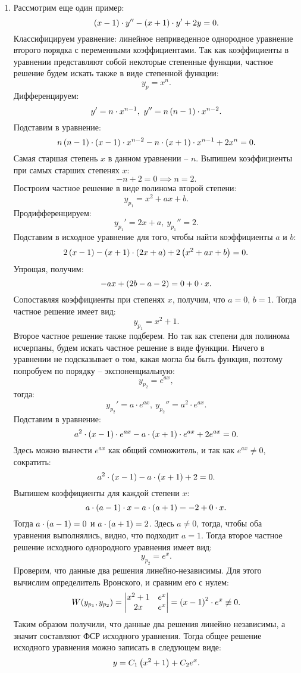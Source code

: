 \begin{enumerate}
			\item Рассмотрим еще один пример:
				\[ \left( x - 1 \right) \cdot y'' - \left( x + 1 \right) \cdot y' + 2y = 0. \]
				Классифицируем уравнение: линейное неприведенное однородное уравнение второго порядка с переменными коэффициентами. Так как коэффициенты в уравнении представляют собой некоторые степенные функции, частное решение будем искать также в виде степенной функции:
				\[ y_p = x^n. \]
				Дифференцируем:
				\[ y' = n \cdot x^{n-1}, ~ y'' = n \left( n-1 \right) \cdot x^{n-2}. \]
				Подставим в уравнение:
				\[ n\left( n - 1 \right) \cdot \left( x - 1 \right) \cdot x^{n-2} - n \cdot \left( x + 1 \right) \cdot x^{n-1} + 2 x^{n} = 0. \]
				Самая старшая степень $x$ в данном уравнении -- $n$. Выпишем коэффициенты при самых старших степенях $x$:
				\[ -n + 2 = 0 \implies n = 2. \]
				Построим частное решение в виде полинома второй степени:
				\[ y_{p_1} = x^2 + ax + b. \]
				Продифференцируем:
				\[ y_{p_1}' = 2x + a, ~ y_{p_1}'' = 2. \]
				Подставим в исходное уравнение для того, чтобы найти коэффициенты $a$ и $b$:
				\[ 2 \left( x - 1 \right) - \left( x + 1 \right) \cdot \left( 2x + a \right) + 2 \left( x^2 + ax + b \right) = 0. \]
				Упрощая, получим:
				\[ -ax + \left( 2b - a - 2 \right) = 0 + 0 \cdot x. \]
				Сопоставляя коэффициенты при степенях $x$, получим, что $a = 0$, $b = 1$. Тогда частное решение имеет вид:
				\[ y_{p_1} = x^2 + 1. \]
				Второе частное решение также подберем. Но так как степени для полинома исчерпаны, будем искать частное решение в виде функции. Ничего в уравнении не подсказывает о том, какая могла бы быть функция, поэтому попробуем по порядку -- экспоненциальную:
				\[ y_{p_2} = e^{ax}, \]
				тогда:
				\[ y_{p_2}' = a \cdot e^{ax}, ~ y_{p_2}'' = a^2 \cdot e^{ax}. \]
				Подставим в уравнение:
				\[ a^2 \cdot \left( x - 1 \right) \cdot e^{ax} - a \cdot \left( x + 1 \right) \cdot e^{ax} + 2e^{ax} = 0. \]
				Здесь можно вынести $e^{ax}$ как общий сомножитель, и так как $e^{ax} \neq 0$, сократить:
				\[ a^2 \cdot \left( x - 1 \right) - a \cdot \left( x + 1 \right) + 2 = 0. \]
				Выпишем коэффициенты для каждой степени $x$:
				\[ a \cdot \left( a - 1 \right) \cdot x - a \cdot \left( a + 1 \right) = -2 + 0 \cdot x. \]
				Тогда $a \cdot \left( a - 1 \right) = 0$ и $a \cdot \left( a + 1 \right) = 2$. Здесь $a \neq 0$, тогда, чтобы оба уравнения выполнялись, видно, что подходит $a = 1$. Тогда второе частное решение исходного однородного уравнения имеет вид:
				\[ y_{p_2} = e^{x}. \]
				Проверим, что данные два решения линейно-независимы. Для этого вычислим определитель Вронского, и сравним его с нулем:
				\[ W(y_{p_1}, y_{p_2}) = \begin{vmatrix}
					x^2 + 1 & e^{x} \\ 2x & e^x
				\end{vmatrix} = \left( x - 1 \right)^2 \cdot e^{x} \not\equiv 0. \]
				Таким образом получили, что данные два решения линейно независимы, а значит составляют ФСР исходного уравнения. Тогда общее решение исходного уравнения можно записать в следующем виде:
				\[ y = C_1 \left( x^2 + 1 \right) + C_2 e^{x}. \]

		\end{enumerate}

	\pagebreak